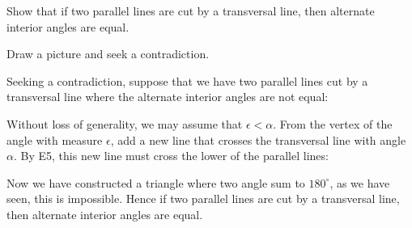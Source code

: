 \documentclass[newpage,hints,handout]{ximera}
\begin{document}
\begin{problem}
\label{24} Show that if two parallel lines are cut by a
transversal line, then alternate interior angles are equal.

\begin{hint}
Draw a picture and seek a contradiction.
\end{hint}
\begin{freeResponse}
Seeking a contradiction, suppose that we have two parallel lines cut
by a transversal line where the alternate interior angles are not
equal:
\begin{image}
\end{image}
Without loss of generality, we may assume that $\epsilon<
\alpha$. From the vertex of the angle with measure $\epsilon$, add a
new line that crosses the transversal line with angle $\alpha$. By E5,
this new line must cross the lower of the parallel lines:
\begin{image}
\end{image}
Now we have constructed a triangle where two angle sum to $180^\circ$,
as we have seen, this is impossible. Hence if two parallel lines are
cut by a transversal line, then alternate interior angles are equal.
\end{freeResponse}

\end{problem}
\end{document}
